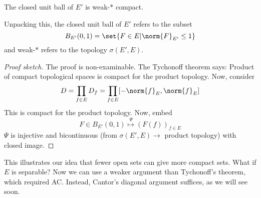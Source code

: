 \documentclass[twoside]{article}
\begin{document}
\begin{thm}\label{thm:bab}
    The closed unit ball of $E'$ is weak-$*$ compact.
\end{thm}
Unpacking this, the closed unit ball of $E'$ refers to the subset
\begin{equation*}
    B_{E'} (0, 1) = \set{F \in E | \norm{F}_{E'} \leq 1}
\end{equation*}
and weak-$*$ refers to the topology $\sigma(E', E)$.
\begin{proof}[Proof sketch]
    The proof is non-examinable.
    The Tychonoff theorem says: Product of compact topological spaces is compact for the product topology.
    Now, consider
    \begin{equation*}
        D = \prod_{f \in E} D_f = \prod_{f \in E} [-\norm{f}_E, \norm{f}_E]
    \end{equation*}
    This is compact for the product topology.
    Now, embed
    \begin{equation*}
        F \in B_{E'}(0, 1) \overset{\Psi}{\longmapsto} (F(f))_{f \in E}
    \end{equation*}
    $\Psi$ is injective and bicontinuous (from $\sigma(E', E) \to $ product topology) with closed image.
\end{proof}

\begin{remark}
    This illustrates our idea that fewer open sets can give more compact sets.
    What if $E$ is separable?
    Now we can use a weaker argument than Tychonoff's theorem, which required AC.
    Instead, Cantor's diagonal argument suffices, as we will see soon.
\end{remark}
\clearpage
\end{document}
